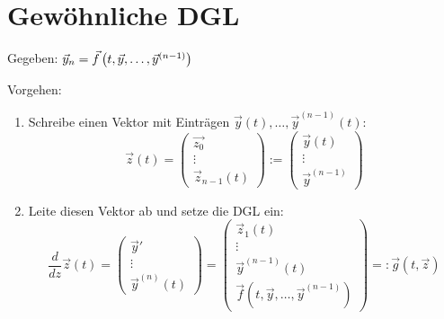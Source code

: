 \section{Gewöhnliche DGL}

\vspace{1\baselineskip}


\vspace{1\baselineskip}


Gegeben: $\vec{y}_n = \vec{f} \left( t,\vec{y},\dots,\vec{y}^{(n-1)} \right)$

Vorgehen:
\begin{enumerate}
    \item Schreibe einen Vektor mit Einträgen $\vec{y}(t),\dots,\vec{y}^{(n-1)}(t)$:
            $$
                \vec{z}(t) = \begin{pmatrix}
                    \vec{z_0} \\ \vdots \\ \vec{z}_{n-1} (t)
                \end{pmatrix}
                := \begin{pmatrix}
                    \vec{y} (t) \\ \vdots \\ \vec{y}^{(n-1)}
                \end{pmatrix}
            $$
    \item Leite diesen Vektor ab und setze die DGL ein:
            $$
                \frac{d}{dz} \vec{z} (t) = \begin{pmatrix}
                    \vec{y}' \\ \vdots \\ \vec{y}^{(n)} (t)
                \end{pmatrix} = \begin{pmatrix}
                    \vec{z}_1 (t) \\ \vdots \\ \vec{y}^{(n-1)} (t) \\ \vec{f}(t,\vec{y},\dots,\vec{y}^{(n-1)})
                \end{pmatrix}
                =: \vec{g}(t,\vec{z})
            $$
\end{enumerate}

\vspace{1\baselineskip}

